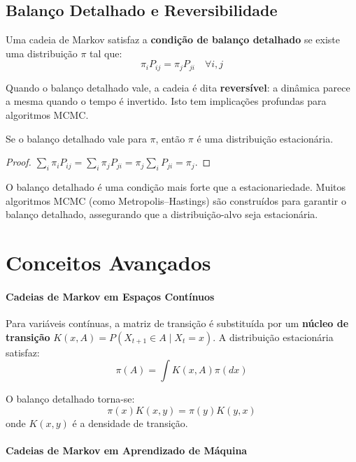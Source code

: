 \documentclass{tufte-handout}
\begin{document}
\subsection{Balanço Detalhado e Reversibilidade}

\begin{defn}
    Uma cadeia de Markov satisfaz a \textbf{condição de balanço detalhado} se existe
    uma distribuição $\pi$ tal que:
    \[
    \pi_i P_{ij} = \pi_j P_{ji} \quad \forall i, j
    \]
\end{defn}

Quando o balanço detalhado vale, a cadeia é dita \textbf{reversível}: a dinâmica parece
a mesma quando o tempo é invertido. Isto tem implicações profundas para algoritmos MCMC.

\begin{prop}
    Se o balanço detalhado vale para $\pi$, então $\pi$ é uma distribuição estacionária.
\end{prop}

\begin{proof}
    $\sum_i \pi_i P_{ij} = \sum_i \pi_j P_{ji} = \pi_j \sum_i P_{ji} = \pi_j$.
\end{proof}

O balanço detalhado é uma condição mais forte que a estacionariedade. Muitos algoritmos
MCMC (como Metropolis--Hastings) são construídos para garantir o balanço detalhado,
assegurando que a distribuição-alvo seja estacionária.

\section{Conceitos Avançados}

\paragraph{Cadeias de Markov em Espaços Contínuos}

Para variáveis contínuas, a matriz de transição é substituída por um \textbf{núcleo de transição}
$K(x, A) = P(X_{t+1} \in A \mid X_t = x)$. A distribuição estacionária satisfaz:
\[
\pi(A) = \int K(x, A) \pi(dx)
\]

O balanço detalhado torna-se:
\[
\pi(x) K(x, y) = \pi(y) K(y, x)
\]
onde $K(x, y)$ é a densidade de transição.

\paragraph{Cadeias de Markov em Aprendizado de Máquina}
\end{document}
